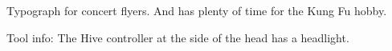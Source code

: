 \begin{npcBox}[title=Norm: Sam]
    \begin{stressSection}
    \end{stressSection}
    \begin{tabularx}{\textwidth}{ XX }
    \end{tabularx}

    \begin{consequences}
    \item {}
    \item {}
    \item {}
    \end{consequences}

    \begin{npcDescription}

    Typograph for concert flyers. And has plenty of time for the Kung Fu hobby.

    Tool info: The Hive controller at the side of the head has a headlight.

    \end{npcDescription}

\end{npcBox}

\newpage

